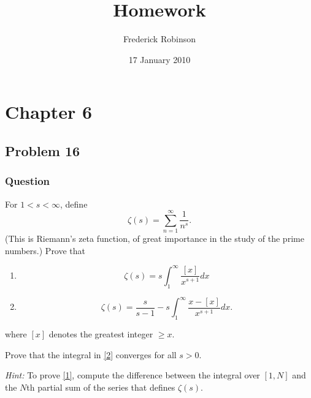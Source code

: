 \documentclass[12pt]{article}
\title{Homework}
\author{Frederick Robinson}
\date{17 January 2010}
\begin{document}

   \maketitle

\setcounter{tocdepth}{2} 


\section{Chapter 6}
\subsection{Problem 16}

\subsubsection{Question}
For $1<s<\infty$, define
\[\zeta(s)=\sum_{n=1}^\infty \frac{1}{n^s}.\]
(This is Riemann's zeta function, of great importance in the study of the prime numbers.) Prove that
\begin{enumerate}
\item \label{1} \[\zeta(s)=s \int_1^\infty \frac{[x]}{x^{s+1}} dx\]
\item \label{2} \[ \zeta (s) = \frac{s}{s-1} - s \int_1^\infty \frac{x-[x]}{x^{s+1}} dx.\]
\end{enumerate}
where $[x]$ denotes the greatest integer $\geq x$.

Prove that the integral in \ref{2} converges for all $s>0$.

\emph{Hint:} To prove \ref{1}, compute the difference between the integral over $[1,N]$ and the $N$th partial sum of the series that defines $\zeta(s)$.
\end{document}
